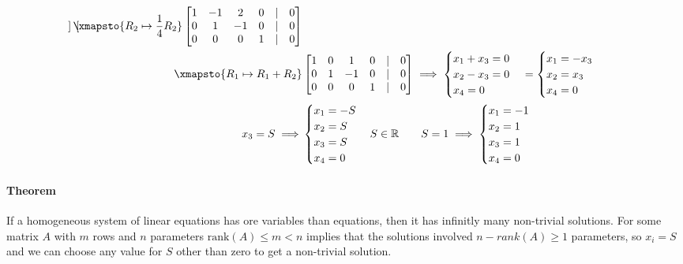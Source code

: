 \begin{align*}
\begin{bmatrix}
    \end{bmatrix} \xmapsto{R_2 \mapsto \frac{1}{4}R_2} \begin{bmatrix}
        1 & -1 & 2 & 0 & | & 0 \\
        0 & 1 & -1 & 0 & | & 0 \\
        0 & 0 & 0 & 1 & | & 0
    \end{bmatrix} \\
    \xmapsto{R_1 \mapsto R_1 + R_2} &\begin{bmatrix}
        1 & 0 & 1 & 0 & | & 0 \\
        0 & 1 & -1 & 0 & | & 0 \\
        0 & 0 & 0 & 1 & | & 0
    \end{bmatrix} \implies \begin{cases}
        x_1 + x_3 = 0 \\
        x_2 - x_3 = 0 \\
        x_4 = 0
    \end{cases} = \begin{cases}
        x_1 = -x_3 \\
        x_2 = x_3 \\
        x_4 = 0
    \end{cases} \\
    x_3 = S \implies &\begin{cases}
        x_1 = -S \\
        x_2 = S \\
        x_3 = S \\
        x_4 = 0
    \end{cases} S \in \mathbb{R} \qquad S = 1 \implies \begin{cases}
        x_1 = -1 \\
        x_2 = 1 \\
        x_3 = 1 \\
        x_4 = 0
    \end{cases}
\end{align*}

\paragraph*{Theorem} If a homogeneous system of linear equations has ore variables than equations, 
then it has infinitly many non-trivial solutions. For some matrix $A$ with $m$ rows and $n$ parameters
 $\text{rank}(A) \leq m < n$ implies that the solutions involved $n-rank(A) \geq 1$ parameters, so $x_i = S$ and 
 we can choose any value for $S$ other than zero to get a non-trivial solution.
